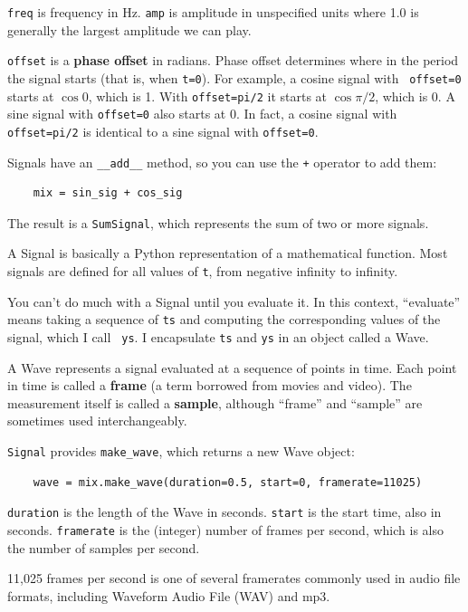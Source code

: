 \documentclass[12pt]{book}
\begin{document}
{\tt freq} is frequency in Hz.  {\tt amp} is amplitude in unspecified
units where 1.0 is generally the largest amplitude we can play.

{\tt offset} is a {\bf phase offset} in radians.
Phase offset determines where in the period the signal starts
(that is, when {\tt t=0}).  For example, a cosine signal with {\tt
  offset=0} starts at $\cos 0$, which is 1.  With {\tt offset=pi/2} it
starts at $\cos \pi/2$, which is 0.
A sine signal with
{\tt offset=0} also starts at 0.  In fact,
a cosine signal with {\tt offset=pi/2} is identical to a sine
signal with {\tt offset=0}.

Signals have an \verb"__add__" method, so you can use the {\tt +}
operator to add them:

\begin{verbatim}
    mix = sin_sig + cos_sig
\end{verbatim}

The result is a {\tt SumSignal}, which represents the sum of two
or more signals.

A Signal is basically a Python representation of a mathematical
function.  Most signals are defined for all values of {\tt t},
from negative infinity to infinity.

You can't do much with a Signal until you evaluate it.  In this
context, ``evaluate'' means taking a sequence of {\tt ts} and
computing the corresponding values of the signal, which I call {\tt
  ys}.  I encapsulate {\tt ts} and {\tt ys} in an object called a
Wave.

A Wave represents a signal evaluated at a sequence of points in
time.  Each point in time is called a {\bf frame} (a term borrowed
from movies and video).  The measurement itself is called a
{\bf sample}, although ``frame'' and ``sample'' are sometimes
used interchangeably.

{\tt Signal} provides \verb"make_wave", which returns a new
Wave object:

\begin{verbatim}
    wave = mix.make_wave(duration=0.5, start=0, framerate=11025)
\end{verbatim}

{\tt duration} is the length of the Wave in seconds.  {\tt start} is
the start time, also in seconds.  {\tt framerate} is the (integer)
number of frames per second, which is also the number of samples
per second.

11,025 frames per second is one of several framerates commonly used in
audio file formats, including Waveform Audio File (WAV) and mp3. 
\end{document}

